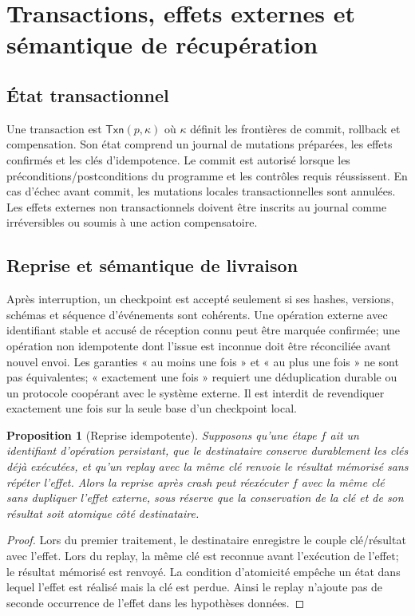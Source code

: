 \documentclass[11pt,a4paper]{article}
\theoremstyle{definition}
\theoremstyle{plain}
\newtheorem{proposition}[definition]{Proposition}
\theoremstyle{remark}
\begin{document}
\section{Transactions, effets externes et sémantique de récupération}
\subsection{État transactionnel}
Une transaction est $\mathsf{Txn}(p,\kappa)$ où $\kappa$ définit les frontières de commit, rollback et compensation. Son état comprend un journal de mutations préparées, les effets confirmés et les clés d'idempotence. Le commit est autorisé lorsque les préconditions/postconditions du programme et les contrôles requis réussissent. En cas d'échec avant commit, les mutations locales transactionnelles sont annulées. Les effets externes non transactionnels doivent être inscrits au journal comme irréversibles ou soumis à une action compensatoire.

\subsection{Reprise et sémantique de livraison}
Après interruption, un checkpoint est accepté seulement si ses hashes, versions, schémas et séquence d'événements sont cohérents. Une opération externe avec identifiant stable et accusé de réception connu peut être marquée confirmée; une opération non idempotente dont l'issue est inconnue doit être réconciliée avant nouvel envoi. Les garanties « au moins une fois » et « au plus une fois » ne sont pas équivalentes; « exactement une fois » requiert une déduplication durable ou un protocole coopérant avec le système externe. Il est interdit de revendiquer exactement une fois sur la seule base d'un checkpoint local.

\begin{proposition}[Reprise idempotente]
Supposons qu'une étape $f$ ait un identifiant d'opération persistant, que le destinataire conserve durablement les clés déjà exécutées, et qu'un replay avec la même clé renvoie le résultat mémorisé sans répéter l'effet. Alors la reprise après crash peut réexécuter $f$ avec la même clé sans dupliquer l'effet externe, sous réserve que la conservation de la clé et de son résultat soit atomique côté destinataire.
\end{proposition}
\begin{proof}
Lors du premier traitement, le destinataire enregistre le couple clé/résultat avec l'effet. Lors du replay, la même clé est reconnue avant l'exécution de l'effet; le résultat mémorisé est renvoyé. La condition d'atomicité empêche un état dans lequel l'effet est réalisé mais la clé est perdue. Ainsi le replay n'ajoute pas de seconde occurrence de l'effet dans les hypothèses données.
\end{proof}
\end{document}
